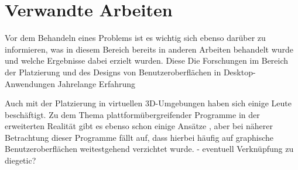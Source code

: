 
\chapter{Verwandte Arbeiten}\label{chapter:background}
	

	
		
		
		
		
		
	Vor dem Behandeln eines Problems ist es wichtig sich ebenso darüber zu informieren, was in diesem Bereich bereits in anderen Arbeiten behandelt wurde und welche Ergebnisse dabei erzielt wurden. Diese 
	Die Forschungen im Bereich der Platzierung und des Designs von Benutzeroberflächen in Desktop-Anwendungen  Jahrelange Erfahrung
	
	
	Auch mit der Platzierung in virtuellen 3D-Umgebungen haben sich einige Leute beschäftigt. 
	Zu dem Thema plattformübergreifender Programme in der erweiterten Realität gibt es ebenso schon einige Ansätze , aber bei näherer Betrachtung dieser Programme fällt auf, dass hierbei häufig auf graphische Benutzeroberflächen weitestgehend verzichtet wurde. 
	- eventuell Verknüpfung zu diegetic?
		
